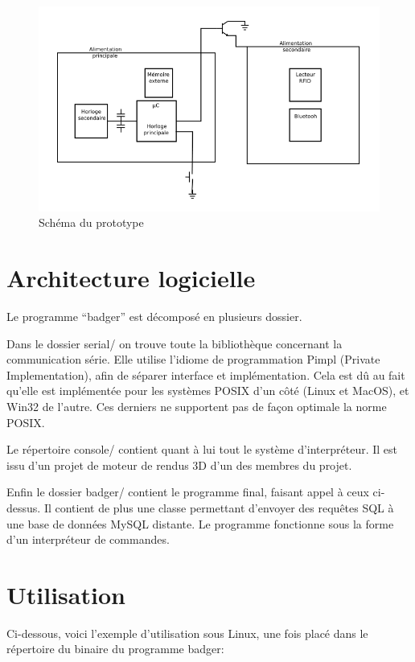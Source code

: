     \begin{figure}[h]
        \begin{center}
            \includegraphics[scale=0.6]{images/protoSchema.png} 
        \end{center}
        \caption{Schéma du prototype}
        \label{Schéma du prototype}
     \end{figure} 


    \section{Architecture logicielle}
Le programme ``badger'' est décomposé en plusieurs dossier. 

Dans le dossier serial/ on trouve toute la bibliothèque concernant la communication
série. Elle utilise l'idiome de programmation Pimpl (Private Implementation), afin 
de séparer interface et implémentation. Cela est dû au fait qu'elle est implémentée
pour les systèmes POSIX d'un côté (Linux et MacOS), et Win32 de l'autre. Ces derniers
ne supportent pas de façon optimale la norme POSIX.

Le répertoire console/ contient quant à lui tout le système d'interpréteur.
Il est issu d'un projet de moteur de rendus 3D d'un des membres du projet.

Enfin le dossier badger/ contient le programme final, faisant appel à ceux
ci-dessus. Il contient de plus une classe permettant d'envoyer des requêtes SQL
à une base de données MySQL distante. Le programme fonctionne sous la forme d'un 
interpréteur de commandes.


    \section{Utilisation}
Ci-dessous, voici l'exemple d'utilisation sous Linux, une fois placé dans le
répertoire du binaire du programme badger:

